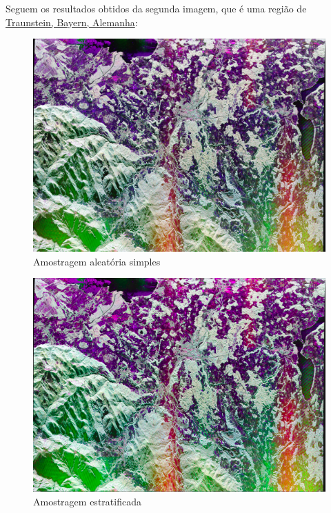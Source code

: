 \documentclass[12pt]{article}
\begin{document}
Seguem os resultados obtidos da segunda imagem, que é uma região de \href{https://uavsar.jpl.nasa.gov/cgi-bin/product.pl?jobName=trauns_22551_15087_016_150604_L090_CX_01#data}{Traunstein, Bayern, Alemanha}:

\begin{figure}[!ht]
	\begin{center}
        \includegraphics[width = 120mm, scale = 0.5]{../../Images/Report_08_18/traunstein_simple_random_sample_reduced} \\ 
        Amostragem aleatória simples\\
	\end{center}
\end{figure}

\begin{figure}[!ht]
	\begin{center}
		\includegraphics[width = 120mm, scale = 0.5]{../../Images/Report_08_18/traunstein_stratified_sample_reduced} \\ 
        Amostragem estratificada\\
	\end{center}
\end{figure}
\end{document}
